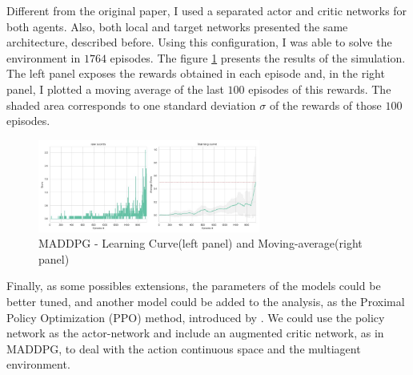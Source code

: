 \documentclass[a4paper]{article}
\begin{document}

Different from the original paper, I used a separated actor and critic networks for both agents. Also, both local and target networks presented the same architecture, described before. Using this configuration, I was able to solve the environment in $1764$ episodes. The figure \ref{fig:ddpg} presents the results of the simulation. The left panel exposes the rewards obtained in each episode and, in the right panel, I plotted a moving average of the last $100$ episodes of this rewards. The shaded area corresponds to one standard deviation $\sigma$ of the rewards of those $100$ episodes.

\begin{figure}[ht]
\centering
\includegraphics[width=0.65\textwidth]{../notebooks/figures/2018-11-07-MADDPG-learning-curve.jpg}
\caption{MADDPG - Learning Curve(left panel) and Moving-average(right panel)}
\label{fig:ddpg}
\end{figure}

Finally, as some possibles extensions, the parameters of the models could be better tuned, and another model could be added to the analysis, as the Proximal Policy Optimization (PPO) method, introduced by \cite{Schulman:2017vq}. We could use the policy network as the actor-network and include an augmented critic network, as in MADDPG,  to deal with the action continuous space and the multiagent environment.









\end{document}
